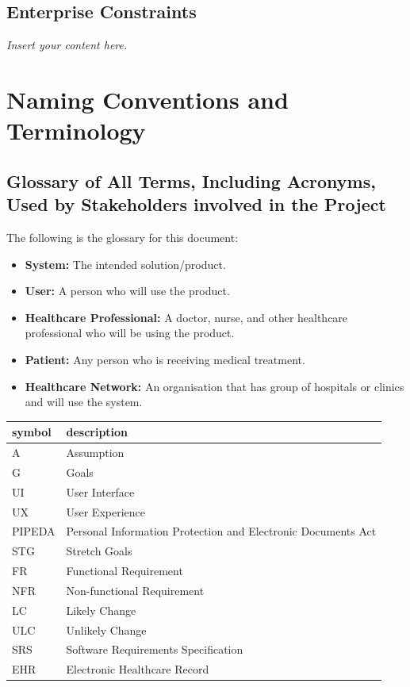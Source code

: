 \documentclass[12pt]{article}
\newcommand{\lips}{\textit{Insert your content here.}}
\begin{document}
\subsection{Enterprise Constraints}
\lips

\section{Naming Conventions and Terminology}

\subsection{Glossary of All Terms, Including Acronyms, Used by Stakeholders
involved in the Project}
The following is the glossary for this document:
\begin{itemize}
  \item \textbf{System:} The intended solution/product.
  \item \textbf{User:} A person who will use the product.
  \item \textbf{Healthcare Professional:} A doctor, nurse, and other healthcare professional who will be using the product.
  \item \textbf{Patient:} Any person who is receiving medical treatment.
  \item \textbf{Healthcare Network:} An organisation that has group of hospitals or clinics and will use the system.
\end{itemize}

\begin{tabular}{l l} 
  \toprule    
  \textbf{symbol} & \textbf{description}\\
  \midrule 
  A & Assumption\\
  G & Goals\\
  UI & User Interface\\
  UX & User Experience\\
  PIPEDA & Personal Information Protection and Electronic Documents Act\\
  STG & Stretch Goals\\
  FR & Functional Requirement\\
  NFR & Non-functional Requirement\\
  LC & Likely Change\\
  ULC & Unlikely Change\\
  SRS & Software Requirements Specification\\
  EHR & Electronic Healthcare Record\\
  \bottomrule
\end{tabular}\\
\end{document}
